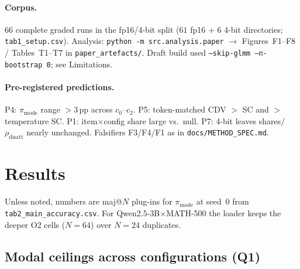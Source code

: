 \documentclass{article}
\newcommand{\pmode}{\pi_{\mathrm{mode}}}
\newcommand{\rdis}{\rho_{\mathrm{disatt}}}
\begin{document}
\paragraph{Corpus.}
66 complete graded runs in the fp16/4-bit split ($61$ fp16 + $6$ 4-bit
directories; \texttt{tab1\_setup.csv}). Analysis:
\texttt{python -m src.analysis.paper} $\rightarrow$ Figures~F1--F8 / Tables~T1--T7
in \texttt{paper\_artefacts/}. Draft build used \texttt{--skip-glmm --n-bootstrap 0};
see Limitations.

\paragraph{Pre-registered predictions.}
P4: $\pmode$ range ${>}3$\,pp across $c_0$--$c_2$. P5: token-matched CDV $>$ SC
and $>$ temperature SC. P1: item$\times$config share large vs.\ null. P7: 4-bit
leaves shares/$\rdis$ nearly unchanged. Falsifiers F3/F4/F1 as in
\texttt{docs/METHOD\_SPEC.md}.

\section{Results}
\label{sec:results}

Unless noted, numbers are maj@$N$ plug-ins for $\pmode$ at seed~$0$ from
\texttt{tab2\_main\_accuracy.csv}. For Qwen2.5-3B$\times$MATH-500 the loader
keeps the deeper O2 cells ($N{=}64$) over $N{=}24$ duplicates.

\subsection{Modal ceilings across configurations (Q1)}
\label{sec:results-ceiling}
\end{document}
